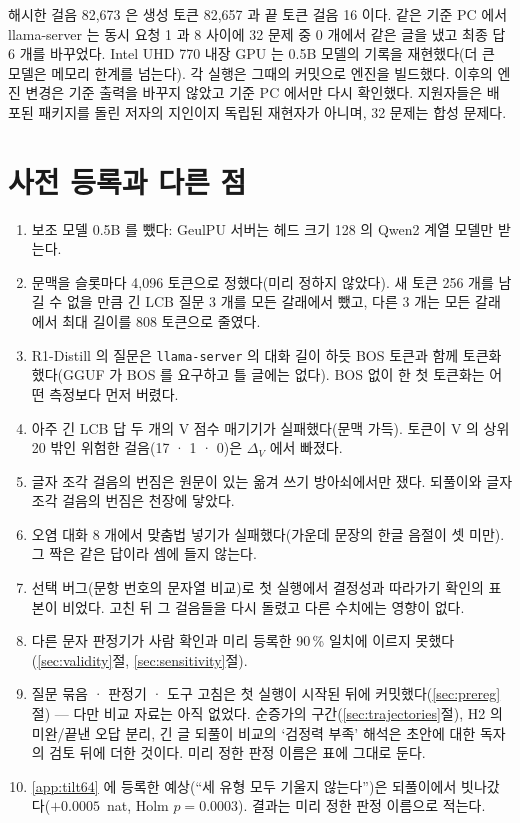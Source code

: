 \documentclass[11pt]{article}
\begin{document}
해시한 걸음 82,673 은 생성 토큰 82,657 과 끝 토큰 걸음 16 이다. 같은 기준 PC 에서 llama-server 는 동시 요청 1 과 8 사이에 32
문제 중 0 개에서 같은 글을 냈고 최종 답 6 개를 바꾸었다. Intel UHD 770 내장 GPU 는 0.5B 모델의 기록을 재현했다(더 큰 모델은
메모리 한계를 넘는다). 각 실행은 그때의 커밋으로 엔진을 빌드했다. 이후의 엔진 변경은 기준 출력을 바꾸지 않았고 기준 PC 에서만
다시 확인했다. 지원자들은 배포된 패키지를 돌린 저자의 지인이지 독립된 재현자가 아니며, 32 문제는 합성 문제다.

\section{사전 등록과 다른 점}\label{app:dev}

\begin{enumerate}
\item 보조 모델 0.5B 를 뺐다: GeulPU 서버는 헤드 크기 128 의 Qwen2 계열 모델만 받는다.
\item 문맥을 슬롯마다 4,096 토큰으로 정했다(미리 정하지 않았다). 새 토큰 256 개를 남길 수 없을 만큼 긴 LCB 질문 3 개를 모든
      갈래에서 뺐고, 다른 3 개는 모든 갈래에서 최대 길이를 808 토큰으로 줄였다.
\item R1-Distill 의 질문은 \texttt{llama-server} 의 대화 길이 하듯 BOS 토큰과 함께 토큰화했다(GGUF 가 BOS 를 요구하고 틀
      글에는 없다). BOS 없이 한 첫 토큰화는 어떤 측정보다 먼저 버렸다.
\item 아주 긴 LCB 답 두 개의 V 점수 매기기가 실패했다(문맥 가득). 토큰이 V 의 상위 20 밖인 위험한 걸음(17 · 1 · 0)은
      $\Delta_V$ 에서 빠졌다.
\item 글자 조각 걸음의 번짐은 원문이 있는 옮겨 쓰기 방아쇠에서만 쟀다. 되풀이와 글자 조각 걸음의 번짐은 천장에 닿았다.
\item 오염 대화 8 개에서 맞춤법 넣기가 실패했다(가운데 문장의 한글 음절이 셋 미만). 그 짝은 같은 답이라 셈에 들지 않는다.
\item 선택 버그(문항 번호의 문자열 비교)로 첫 실행에서 결정성과 따라가기 확인의 표본이 비었다. 고친 뒤 그 걸음들을 다시
      돌렸고 다른 수치에는 영향이 없다.
\item 다른 문자 판정기가 사람 확인과 미리 등록한 90\,\% 일치에 이르지 못했다(\ref{sec:validity}절, \ref{sec:sensitivity}절).
\item 질문 묶음 · 판정기 · 도구 고침은 첫 실행이 시작된 뒤에 커밋했다(\ref{sec:prereg}절) --- 다만 비교 자료는 아직 없었다.
      순증가의 구간(\ref{sec:trajectories}절), H2 의 미완/끝낸 오답 분리, 긴 글 되풀이 비교의 `검정력 부족' 해석은 초안에 대한
      독자의 검토 뒤에 더한 것이다. 미리 정한 판정 이름은 표에 그대로 둔다.
\item \ref{app:tilt64} 에 등록한 예상(``세 유형 모두 기울지 않는다'')은 되풀이에서 빗나갔다($+0.0005$~nat, Holm $p=0.0003$).
      결과는 미리 정한 판정 이름으로 적는다.
\end{enumerate}
\end{document}
